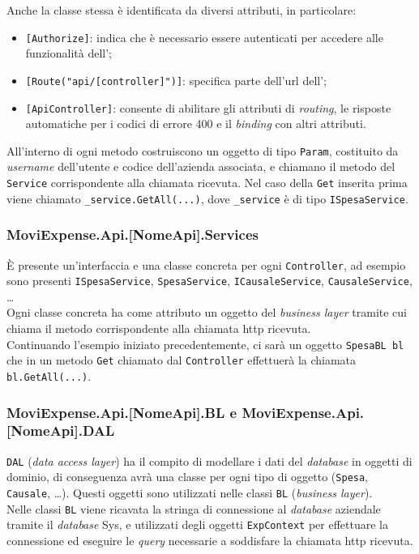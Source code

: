 \noindent Anche la classe stessa è identificata da diversi attributi, in particolare:
\begin{itemize}
    \item \texttt{[Authorize]}: indica che è necessario essere autenticati per accedere alle funzionalità dell';
    \item \texttt{[Route("api/[controller]")]}: specifica parte dell'url dell';
    \item \texttt{[ApiController]}: consente di abilitare gli attributi di \textit{routing}, le risposte automatiche per i codici di errore 400 e il \textit{binding} con altri attributi.
\end{itemize}

\noindent All'interno di ogni metodo costruiscono un oggetto di tipo \texttt{Param}, costituito da \textit{username} dell'utente e codice dell'azienda associata, e chiamano il metodo del \texttt{Service} corrispondente alla chiamata ricevuta. Nel caso della \texttt{Get} inserita prima viene
chiamato \texttt{\_service.GetAll(...)}, dove \texttt{\_service} è di tipo \texttt{ISpesaService}.

\subsubsection{MoviExpense.Api.[NomeApi].Services}
\label{cap:services}

È presente un'interfaccia e una classe concreta per ogni \texttt{Controller}, ad esempio sono presenti \texttt{ISpesaService}, \texttt{SpesaService}, \texttt{ICausaleService}, \texttt{CausaleService}, \dots\\
Ogni classe concreta ha come attributo un oggetto del \textit{business layer} tramite cui chiama il metodo corrispondente alla chiamata http ricevuta.\\
Continuando l'esempio iniziato precedentemente, ci sarà un oggetto \texttt{SpesaBL bl} che in un metodo \texttt{Get} chiamato dal \texttt{Controller} effettuerà la chiamata \texttt{bl.GetAll(...)}.

\subsubsection{MoviExpense.Api.[NomeApi].BL e MoviExpense.Api.[NomeApi].DAL}

\texttt{DAL} (\textit{data access layer}) ha il compito di modellare i dati del \textit{database} in oggetti di dominio, di conseguenza avrà una classe per ogni tipo di oggetto (\texttt{Spesa}, \texttt{Causale}, \dots). Questi oggetti sono utilizzati nelle classi \texttt{BL} (\textit{business layer}).\\
Nelle classi \texttt{BL} viene ricavata la stringa di connessione al \textit{database} aziendale tramite il \textit{database} Sys, e utilizzati degli oggetti \texttt{ExpContext} per effettuare la connessione ed eseguire le \textit{query} necessarie a soddisfare la chiamata http ricevuta.

